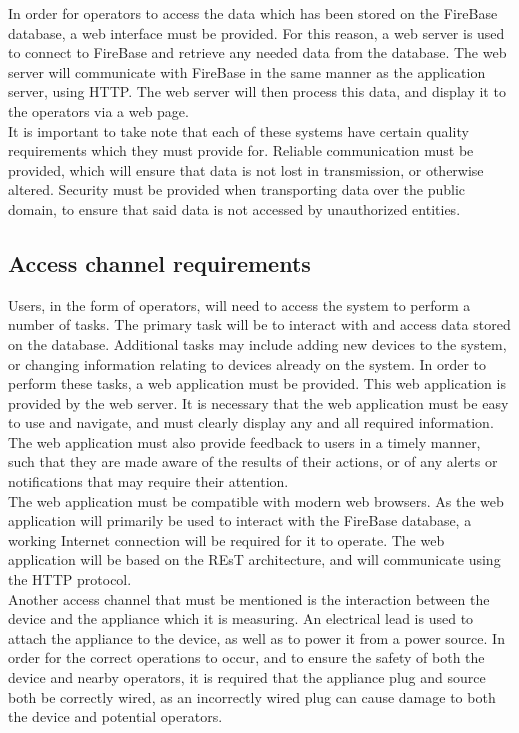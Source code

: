 \documentclass{article}
\begin{document}
	In order for operators to access the data which has been stored on 
	the FireBase database, a web interface must be provided. For this 
	reason, a web server is used to connect to FireBase and retrieve any 
	needed data from the database. The web server will communicate with 
	FireBase in the same manner as the application server, using HTTP. 
	The web server will then process this data, and display it to the 
	operators via a web page.\\
	
	It is important to take note that each of these systems have certain 
	quality requirements which they must provide for. Reliable 
	communication must be provided, which will ensure that data is not 
	lost in transmission, or otherwise altered. Security must be provided 
	when transporting data over the public domain, to ensure that said 
	data is not accessed by unauthorized entities.
	
	\newpage
	
	\subsection{Access channel requirements}
	
	Users, in the form of operators, will need to access the system to 
	perform a number of tasks. The primary task will be to interact with 
	and access data stored on the database. Additional tasks may include 
	adding new devices to the system, or changing information relating to 
	devices already on the system. In order to perform these tasks, a web 
	application must be provided. This web application is provided by the 
	web server. It is necessary that the web application must be easy to 
	use and navigate, and must clearly display any and all required 
	information. The web application must also provide feedback to users 
	in a timely manner, such that they are made aware of the results of 
	their actions, or of any alerts or notifications that may require 
	their attention.\\
	
	The web application must be compatible with modern web browsers. As 
	the web application will primarily be used to interact with the 
	FireBase database, a working Internet connection will be required for 
	it to operate. The web application will be based on the REsT 
	architecture, and will communicate using the HTTP protocol.\\
	
	Another access channel that must be mentioned is the interaction 
	between the device and the appliance which it is measuring. An 
	electrical lead is used to attach the appliance to the device, as 
	well as to power it from a power source. In order for the correct 
	operations to occur, and to ensure the safety of both the device and 
	nearby operators, it is required that the appliance plug and source 
	both be correctly wired, as an incorrectly wired plug can cause 
	damage to both the device and potential operators.
	
\end{document}
